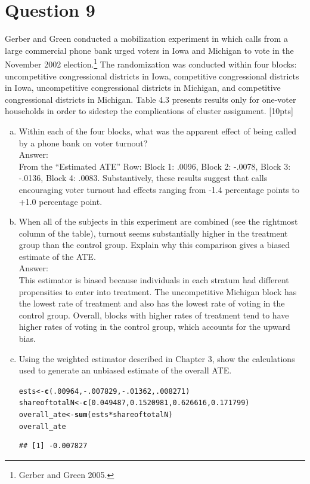 \documentclass[11pt,notitlepage]{article}\usepackage[]{graphicx}\usepackage[]{color}
\makeatletter
\newcommand{\hlnum}[1]{\textcolor[rgb]{0.686,0.059,0.569}{#1}}%
\newcommand{\hlopt}[1]{\textcolor[rgb]{0,0,0}{#1}}%
\newcommand{\hlstd}[1]{\textcolor[rgb]{0.345,0.345,0.345}{#1}}%
\newcommand{\hlkwb}[1]{\textcolor[rgb]{0.69,0.353,0.396}{#1}}%
\newcommand{\hlkwd}[1]{\textcolor[rgb]{0.737,0.353,0.396}{\textbf{#1}}}%
\newenvironment{kframe}{%
 \def\at@end@of@kframe{}%
 \ifinner\ifhmode%
  \def\at@end@of@kframe{\end{minipage}}%
  \begin{minipage}{\columnwidth}%
 \fi\fi%
 \def\FrameCommand##1{\hskip\@totalleftmargin \hskip-\fboxsep
 \colorbox{shadecolor}{##1}\hskip-\fboxsep
     \hskip-\linewidth \hskip-\@totalleftmargin \hskip\columnwidth}%
 \MakeFramed {\advance\hsize-\width
   \@totalleftmargin\z@ \linewidth\hsize
   \@setminipage}}%
 {\par\unskip\endMakeFramed%
 \at@end@of@kframe}
\newenvironment{knitrout}{}{} %
\makeatother
\begin{document}
\section*{Question 9}
Gerber and Green conducted a mobilization experiment in which calls from a large commercial phone bank urged voters in Iowa and Michigan to vote in the November 2002 election.\footnote{Gerber and Green 2005.} The randomization was conducted within four blocks: uncompetitive congressional districts in Iowa, competitive congressional districts in Iowa, uncompetitive congressional districts in Michigan, and competitive congressional districts in Michigan. Table 4.3 presents results only for one-voter households in order to sidestep the complications of cluster assignment. [10pts]



\begin{enumerate}[a)]
\item Within each of the four blocks, what was the apparent effect of being called by a phone bank on voter turnout?  \\
Answer:\\
From the ``Estimated ATE'' Row: Block 1: .0096, Block 2: -.0078, Block 3: -.0136, Block 4: .0083.  Substantively, these results suggest that calls encouraging voter turnout had effects ranging from -1.4 percentage points to +1.0 percentage point.
\item When all of the subjects in this experiment are combined (see the rightmost column of the table), turnout seems substantially higher in the treatment group than the control group.  Explain why this comparison gives a biased estimate of the ATE.\\
Answer:\\
This estimator is biased because individuals in each stratum had different propensities to enter into treatment. The uncompetitive Michigan block has the lowest rate of treatment and also has the lowest rate of voting in the control group. Overall, blocks with higher rates of treatment tend to have higher rates of voting in the control group, which accounts for the upward bias.
\item Using the weighted estimator described in Chapter 3, show the calculations used to generate an unbiased estimate of the overall ATE. 
\begin{knitrout}
\color{fgcolor}\begin{kframe}
\begin{alltt}
\hlstd{ests} \hlkwb{<-} \hlkwd{c}\hlstd{(}\hlnum{.00964}\hlstd{,} \hlopt{-}\hlnum{.007829}\hlstd{,} \hlopt{-}\hlnum{.01362}\hlstd{,}\hlnum{.008271}\hlstd{)}
\hlstd{shareoftotalN} \hlkwb{<-} \hlkwd{c}\hlstd{(}\hlnum{0.049487}\hlstd{,} \hlnum{0.1520981}\hlstd{,} \hlnum{0.626616}\hlstd{,} \hlnum{0.171799}\hlstd{)}
\hlstd{overall_ate} \hlkwb{<-}\hlkwd{sum}\hlstd{(ests}\hlopt{*}\hlstd{shareoftotalN)}
\hlstd{overall_ate}
\end{alltt}
\begin{verbatim}
## [1] -0.007827
\end{verbatim}
\end{kframe}
\end{knitrout}


\end{enumerate}
\end{document}
